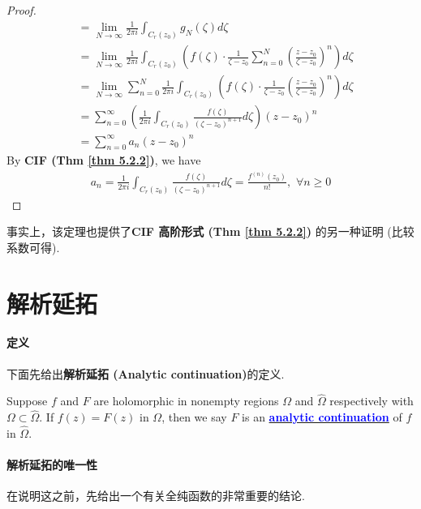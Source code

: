\begin{thm}
\begin{proof}
\begin{align}
			&= \lim_{N \to \infty}{\frac{1}{2 \pi i} \int_{C_{r}(z_0)}{g_{N}(\zeta) d\zeta}} \\
			&= \lim_{N \to \infty}{\frac{1}{2 \pi i} \int_{C_{r}(z_0)}{ \left( f(\zeta) \cdot \frac{1}{\zeta - z_0} \sum_{n = 0}^{N}{\left( \frac{z - z_0}{\zeta - z_0} \right)^n } \right) d\zeta } } \\
			&= \lim_{N \to \infty}{\sum_{n = 0}^{N} \frac{1}{2 \pi i} \int_{C_{r}(z_0)}{ \left( f(\zeta) \cdot \frac{1}{\zeta - z_0} \left( \frac{z - z_0}{\zeta - z_0} \right)^n \right) d\zeta } } \\
			&= \sum_{n = 0}^{\infty} \left( \frac{1}{2 \pi i} \int_{C_{r}(z_0)}{ \frac{f(\zeta)}{(\zeta - z_0)^{n + 1}} d\zeta } \right) (z - z_0)^n \\
			&= \sum_{n = 0}^{\infty}{a_n (z - z_0)^n}
		\end{align}
		By \textbf{CIF (Thm \ref{thm 5.2.2})}, we have
		\begin{align}
			a_n = \frac{1}{2 \pi i} \int_{C_{r}(z_0)}{ \frac{f(\zeta)}{(\zeta - z_0)^{n + 1}} d\zeta } = \frac{f^{(n)}(z_0)}{n!} , \,\, \forall n \geq 0
		\end{align}
	\end{proof}
	
	\begin{rmk}
		事实上，该定理也提供了\textbf{CIF 高阶形式 (Thm \ref{thm 5.2.2})} 的另一种证明 (比较系数可得).
	\end{rmk}
\end{thm}

\newpage

\section{解析延拓}
\paragraph{定义}
下面先给出\textbf{解析延拓 (Analytic continuation)}的定义.
\begin{defn}\label{def 6.3.1}
	Suppose $f$ and $F$ are holomorphic in nonempty regions $\Omega$ and $\hat{\Omega}$ respectively with $\Omega \subset \hat{\Omega}$. If $f(z) = F(z)$ in $\Omega$, then we say $F$ is an \underline{\textcolor{blue}{\textbf{analytic continuation}}} of $f$ in $\hat{\Omega}$.
\end{defn}

\vspace{2em}
\paragraph{解析延拓的唯一性}
在说明这之前，先给出一个有关全纯函数的非常重要的结论.

